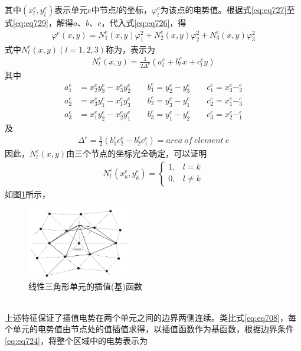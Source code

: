 \documentclass{article}
\numberwithin{equation}{section}
\begin{document}
其中$(x_l^e,y_l^e)$表示单元$e$中节点$l$的坐标，$\varphi_l^e$为该点的电势值。根据式\ref{eq:eq727}至式\ref{eq:eq729}，解得$a$、$b$、$c$，代入式\ref{eq:eq726}，得
\begin{align}
    \label{eq:eq730}
    \varphi^e(x,y)=N_1^e(x,y)\varphi_1^2+N_2^e(x,y)\varphi_2^2+N_3^e(x,y)\varphi_3^2
\end{align}
式中$N_l^e(x,y)(l=1,2,3)$称为\textbf{\color{blue}{插值函数}}，表示为
\begin{align}
    \label{eq:eq731}
    N_l^e(x,y)=\frac{1}{2\Delta^e}(a_l^e+b_l^ex+c_l^ey)
\end{align}
其中
\begin{align}
    \label{eq:eq732}
    a_1^e&=x_2^ey_3^e-x_3^ey_2^e\qquad b_1^e=y_2^e-y_3^e\qquad c_1^e=x_3^e-_2^e \nonumber \\
    a_2^e&=x_3^ey_1^e-x_1^ey_3^e\qquad b_2^e=y_3^e-y_1^e\qquad c_2^e=x_1^e-_3^e \\
    a_3^e&=x_1^ey_2^e-x_2^ey_1^e\qquad b_3^e=y_1^e-y_2^e\qquad c_3^e=x_2^e-_1^e \nonumber
\end{align}
及
\begin{align}
    \label{eq:eq733}
    \Delta^e=\frac{1}{2}(b_1^ec_2^e-b_2^ec_1^e)=area~of~element~e
\end{align}
因此，$N_l^e(x,y)$由三个节点的坐标完全确定，可以证明
\begin{align}
    \label{eq:eq734}
    N_l^e(x_k^e,y_k^e)=
    \left\{
    \begin{array}{lr}
        1,&l=k \\
        0,&l\neq k
    \end{array}
    \right.
\end{align}
如图\ref{fig:fig59}所示，
\begin{figure}[ht]
    \centering
    \includegraphics[width=0.4\textwidth]{线性三角形单元的插值(基)函数.PNG}
    \caption{线性三角形单元的插值(基)函数}
    \label{fig:fig59}
\end{figure}
\\
上述特征保证了插值电势在两个单元之间的边界两侧连续。类比式\ref{eq:eq708}，每个单元的电势值由节点处的值插值求得，以插值函数作为基函数，根据边界条件\ref{eq:eq724}，将整个区域中的电势表示为
\end{document}
